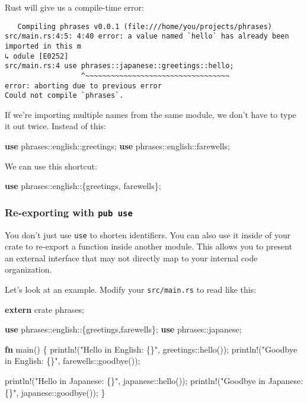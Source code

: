 \documentclass[a4paper,]{book}
\newenvironment{Shaded}{\begin{snugshade}}{\end{snugshade}}
\newcommand{\KeywordTok}[1]{\textcolor[rgb]{0.13,0.29,0.53}{\textbf{{#1}}}}
\newcommand{\StringTok}[1]{\textcolor[rgb]{0.31,0.60,0.02}{{#1}}}
\newcommand{\OtherTok}[1]{\textcolor[rgb]{0.56,0.35,0.01}{{#1}}}
\newcommand{\NormalTok}[1]{{#1}}
\begin{document}
Rust will give us a compile-time error:

\begin{verbatim}
   Compiling phrases v0.0.1 (file:///home/you/projects/phrases)
src/main.rs:4:5: 4:40 error: a value named `hello` has already been imported in this m
↳ odule [E0252]
src/main.rs:4 use phrases::japanese::greetings::hello;
                  ^~~~~~~~~~~~~~~~~~~~~~~~~~~~~~~~~~~
error: aborting due to previous error
Could not compile `phrases`.
\end{verbatim}

If we're importing multiple names from the same module, we don't have to
type it out twice. Instead of this:

\begin{Shaded}
\begin{Highlighting}[]
\KeywordTok{use} \NormalTok{phrases::english::greetings;}
\KeywordTok{use} \NormalTok{phrases::english::farewells;}
\end{Highlighting}
\end{Shaded}

We can use this shortcut:

\begin{Shaded}
\begin{Highlighting}[]
\KeywordTok{use} \NormalTok{phrases::english::\{greetings, farewells\};}
\end{Highlighting}
\end{Shaded}

\subsubsection{\texorpdfstring{Re-exporting with
\texttt{pub\ use}}{Re-exporting with pub use}}\label{re-exporting-with-pub-use}

You don't just use \texttt{use} to shorten identifiers. You can also use
it inside of your crate to re-export a function inside another module.
This allows you to present an external interface that may not directly
map to your internal code organization.

Let's look at an example. Modify your \texttt{src/main.rs} to read like
this:

\begin{Shaded}
\begin{Highlighting}[]
\KeywordTok{extern} \NormalTok{crate phrases;}

\KeywordTok{use} \NormalTok{phrases::english::\{greetings,farewells\};}
\KeywordTok{use} \NormalTok{phrases::japanese;}

\KeywordTok{fn} \NormalTok{main() \{}
    \OtherTok{println!}\NormalTok{(}\StringTok{"Hello in English: \{\}"}\NormalTok{, greetings::hello());}
    \OtherTok{println!}\NormalTok{(}\StringTok{"Goodbye in English: \{\}"}\NormalTok{, farewells::goodbye());}

    \OtherTok{println!}\NormalTok{(}\StringTok{"Hello in Japanese: \{\}"}\NormalTok{, japanese::hello());}
    \OtherTok{println!}\NormalTok{(}\StringTok{"Goodbye in Japanese: \{\}"}\NormalTok{, japanese::goodbye());}
\NormalTok{\}}
\end{Highlighting}
\end{Shaded}
\end{document}
